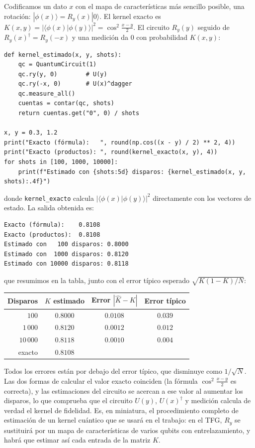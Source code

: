 \documentclass[11pt, a4paper, twoside, openright]{report}
\begin{document}
\noindent Codificamos un dato $x$ con el mapa de características más sencillo posible, una rotación: $|\phi(x)\rangle = R_y(x)|0\rangle$. El kernel exacto es $K(x,y) = |\langle\phi(x)|\phi(y)\rangle|^2 = \cos^2\frac{x-y}{2}$. El circuito $R_y(y)$ seguido de $R_y(x)^\dagger = R_y(-x)$ y una medición da $0$ con probabilidad $K(x,y)$:
\begin{lstlisting}
def kernel_estimado(x, y, shots):
    qc = QuantumCircuit(1)
    qc.ry(y, 0)        # U(y)
    qc.ry(-x, 0)       # U(x)^dagger
    qc.measure_all()
    cuentas = contar(qc, shots)
    return cuentas.get("0", 0) / shots

x, y = 0.3, 1.2
print("Exacto (fórmula):   ", round(np.cos((x - y) / 2) ** 2, 4))
print("Exacto (productos): ", round(kernel_exacto(x, y), 4))
for shots in [100, 1000, 10000]:
    print(f"Estimado con {shots:5d} disparos: {kernel_estimado(x, y, shots):.4f}")
\end{lstlisting}
\noindent donde \texttt{kernel\_exacto} calcula $|\langle\phi(x)|\phi(y)\rangle|^2$ directamente con los vectores de estado. La salida obtenida es:
\begin{lstlisting}[language={}]
Exacto (fórmula):    0.8108
Exacto (productos):  0.8108
Estimado con   100 disparos: 0.8000
Estimado con  1000 disparos: 0.8120
Estimado con 10000 disparos: 0.8118
\end{lstlisting}
\noindent que resumimos en la tabla, junto con el error típico esperado $\sqrt{K(1-K)/N}$:
\begin{center}
\begin{tabular}{r|c|c|c}
\textbf{Disparos} & \textbf{$K$ estimado} & \textbf{Error} $|\hat K - K|$ & \textbf{Error típico} \\ \hline
$100$ & $0.8000$ & $0.0108$ & $0.039$ \\
$1\,000$ & $0.8120$ & $0.0012$ & $0.012$ \\
$10\,000$ & $0.8118$ & $0.0010$ & $0.004$ \\ \hline
exacto & $0.8108$ & &
\end{tabular}
\end{center}
\noindent Todos los errores están por debajo del error típico, que disminuye como $1/\sqrt N$. Las dos formas de calcular el valor exacto coinciden (la fórmula $\cos^2\frac{x-y}{2}$ es correcta), y las estimaciones del circuito se acercan a ese valor al aumentar los disparos, lo que comprueba que el circuito $U(y)$, $U(x)^\dagger$ y medición calcula de verdad el kernel de fidelidad. Es, en miniatura, el procedimiento completo de estimación de un kernel cuántico que se usará en el trabajo: en el TFG, $R_y$ se sustituirá por un mapa de características de varios qubits con entrelazamiento, y habrá que estimar así cada entrada de la matriz $K$.
\end{document}
